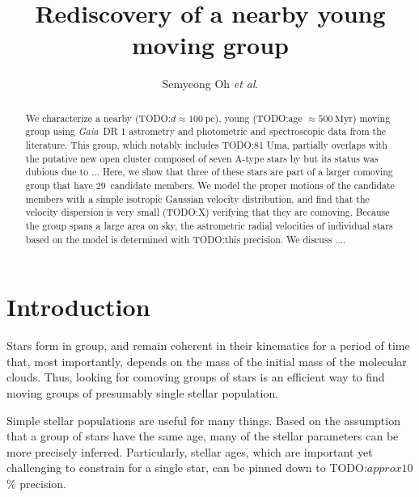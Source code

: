\documentclass[modern,letterpaper]{aastex61}
\newcommand{\project}[1]{\textsl{#1}}
\newcommand{\gaia}{\project{Gaia}}
\newcommand{\etal}{\textit{et al}.}
\newcommand{\todo}[1]{{\color{crimson}TODO:#1}}
\newcommand{\groupDistanceEstimate}{\ensuremath{100~\mathrm{pc}}}
\newcommand{\groupAgeEstimate}{\ensuremath{500~\mathrm{Myr}}}
\newcommand{\totalNumberOfCandidates}{\ensuremath{29}}
\begin{document}
\sloppy\sloppypar\raggedbottom\frenchspacing %

\title{
  Rediscovery of a nearby young moving group
}

\author[0000-0001-7790-5308]{Semyeong Oh \etal}


\begin{abstract}

  We characterize a nearby (\todo{$d \approx \groupDistanceEstimate$}),
  young (\todo{age $\approx \groupAgeEstimate$}) moving group using \gaia\ DR 1
  astrometry and photometric and spectroscopic data from the literature.
  This group, which notably includes \todo{81 Uma},
  partially overlaps with the putative new open cluster composed of
  seven A-type stars by \citet{1977ATsir.969....7L} but its status
  was dubious due to ...
  Here, we show that three of these stars are part of a larger comoving group
  that have \totalNumberOfCandidates\ candidate members.
  We model the proper motions of the candidate members with a simple
  isotropic Gaussian velocity distribution, and find that
  the velocity dispersion is very small (\todo{X}) verifying
  that they are comoving.
  Because the group spans a large area on sky, the astrometric radial velocities
  of individual stars based on the model is determined with \todo{this precision}.
  We discuss ....

\end{abstract}

\section{Introduction} %
\label{sec:introduction}

Stars form in group, and remain coherent in their kinematics for a period of
time that, most importantly, depends on the mass of the initial mass of the
molecular clouds. Thus, looking for comoving groups of stars is an efficient
way to find moving groups of presumably single stellar population.

Simple stellar populations are useful for many things. Based on the assumption
that a group of stars have the same age, many of the stellar parameters can be
more precisely inferred. Particularly, stellar ages, which are important yet
challenging to constrain for a single star, can be pinned down to
\todo{$approx 10$\%} precision.
\end{document}
